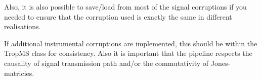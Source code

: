  Also, it is also possible to save/load from most of the signal corruptions if you needed to ensure that the corruption used is exactly the same in different realisations. 



If additional instrumental corruptions are implemented, this should be within the TropMS class for consistency. Also it is important that the pipeline respects the causality of signal transmission path and/or the commutativity of Jones-matricies.


















